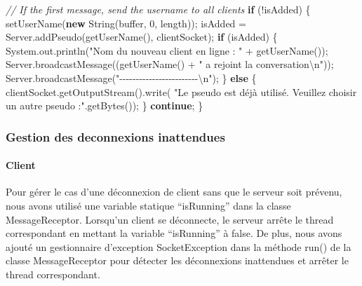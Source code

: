 \documentclass[
]{article}
\newenvironment{Shaded}{}{}
\newcommand{\BuiltInTok}[1]{#1}
\newcommand{\CommentTok}[1]{\textcolor[rgb]{0.38,0.63,0.69}{\textit{#1}}}
\newcommand{\DecValTok}[1]{\textcolor[rgb]{0.25,0.63,0.44}{#1}}
\newcommand{\FunctionTok}[1]{\textcolor[rgb]{0.02,0.16,0.49}{#1}}
\newcommand{\KeywordTok}[1]{\textcolor[rgb]{0.00,0.44,0.13}{\textbf{#1}}}
\newcommand{\NormalTok}[1]{#1}
\newcommand{\SpecialCharTok}[1]{\textcolor[rgb]{0.25,0.44,0.63}{#1}}
\newcommand{\StringTok}[1]{\textcolor[rgb]{0.25,0.44,0.63}{#1}}
\begin{document}
\begin{Shaded}
\begin{Highlighting}[]
\CommentTok{// If the first message, send the username to all clients}
\KeywordTok{if}\NormalTok{ (!isAdded) \{}
    \FunctionTok{setUserName}\NormalTok{(}\KeywordTok{new} \BuiltInTok{String}\NormalTok{(buffer, }\DecValTok{0}\NormalTok{, length));}
\NormalTok{    isAdded = Server.}\FunctionTok{addPseudo}\NormalTok{(}\FunctionTok{getUserName}\NormalTok{(), clientSocket);}
    \KeywordTok{if}\NormalTok{ (isAdded) \{}
        \BuiltInTok{System}\NormalTok{.}\FunctionTok{out}\NormalTok{.}\FunctionTok{println}\NormalTok{(}\StringTok{"Nom du nouveau client en ligne : "}\NormalTok{ + }\FunctionTok{getUserName}\NormalTok{());}
\NormalTok{        Server.}\FunctionTok{broadcastMessage}\NormalTok{((}\FunctionTok{getUserName}\NormalTok{() + }\StringTok{" a rejoint la conversation}\SpecialCharTok{\textbackslash{}n}\StringTok{"}\NormalTok{));}
\NormalTok{        Server.}\FunctionTok{broadcastMessage}\NormalTok{(}\StringTok{"{-}{-}{-}{-}{-}{-}{-}{-}{-}{-}{-}{-}{-}{-}{-}{-}{-}{-}{-}{-}{-}{-}{-}{-}}\SpecialCharTok{\textbackslash{}n}\StringTok{"}\NormalTok{);}
\NormalTok{    \} }\KeywordTok{else}\NormalTok{ \{}
\NormalTok{        clientSocket.}\FunctionTok{getOutputStream}\NormalTok{().}\FunctionTok{write}\NormalTok{(}
            \StringTok{"Le pseudo est déjà utilisé. Veuillez choisir un autre pseudo :"}\NormalTok{.}\FunctionTok{getBytes}\NormalTok{());}
\NormalTok{    \}}
    \KeywordTok{continue}\NormalTok{;}
\NormalTok{\}}
\end{Highlighting}
\end{Shaded}

\hypertarget{gestion-des-deconnexions-inattendues}{%
\subsubsection{Gestion des deconnexions
inattendues}\label{gestion-des-deconnexions-inattendues}}

\hypertarget{client}{%
\paragraph{Client\\}\label{client}}

Pour gérer le cas d'une déconnexion de client sans que le serveur soit
prévenu, nous avons utilisé une variable statique ``isRunning'' dans la
classe MessageReceptor. Lorsqu'un client se déconnecte, le serveur
arrête le thread correspondant en mettant la variable ``isRunning'' à
false. De plus, nous avons ajouté un gestionnaire d'exception
SocketException dans la méthode run() de la classe MessageReceptor pour
détecter les déconnexions inattendues et arrêter le thread
correspondant.
\end{document}
